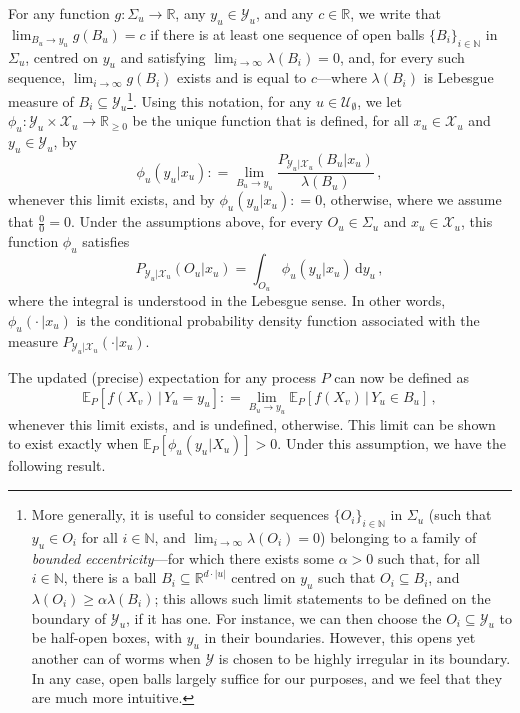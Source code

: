 \documentclass[twoside,11pt]{article}
\newcommand{\nats}{\mathbb{N}}
\newcommand{\reals}{\mathbb{R}}
\newcommand{\realsnonneg}{\reals_{\geq 0}}
\newcommand{\states}{\mathcal{X}}
\newcommand{\observs}{\mathcal{Y}}
\newcommand{\coloneqq}{:\!=}
\begin{document}
For any function $g:\Sigma_u\to\reals$, any $y_u\in\observs_u$, and any $c\in\reals$, we write that $\lim_{B_u\to y_u}g(B_u)=c$ if there is at least one sequence of open balls $\{B_i\}_{i\in\nats}$ in $\Sigma_u$, centred on $y_u$ and satisfying $\lim_{i\to\infty}\lambda(B_i)=0$, and, for every such sequence, $\lim_{i\to\infty}g(B_i)$ exists and is equal to $c$---where $\lambda(B_i)$ is Lebesgue measure of $B_i\subseteq\observs_u$\footnote{More generally, it is useful to consider sequences $\{O_i\}_{i\in\nats}$ in $\Sigma_u$ (such that $y_u\in O_i$ for all $i\in\nats$, and $\lim_{i\to\infty}\lambda(O_i)=0$) belonging to a family of \emph{bounded eccentricity}---for which there exists some $\alpha > 0$ such that, for all $i\in\nats$, there is a ball $B_i\subseteq\reals^{d\cdot\lvert u\rvert}$ centred on $y_u$ such that $O_i\subseteq B_i$, and $\lambda(O_i)\geq \alpha\lambda(B_i)$; this allows such limit statements to be defined on the boundary of $\observs_u$, if it has one. For instance, we can then choose the $O_i\subseteq\observs_u$ to be half-open boxes, with $y_u$ in their boundaries. However, this opens yet another can of worms when $\observs$ is chosen to be highly irregular in its boundary. In any case, open balls largely suffice for our purposes, and we feel that they are much more intuitive.}. Using this notation, for any $u\in\mathcal{U}_\emptyset$, we let $\phi_u:\observs_u\times\states_u\to\realsnonneg$ be the unique function that is defined, for all $x_u\in\states_u$ and $y_u\in\observs_u$, by
\begin{equation}\label{eq:density_is_limit}
\phi_u(y_u\vert x_u) \coloneqq \lim_{B_u\to y_u} \frac{P_{\observs_u\vert\states_u}(B_u\vert x_u)}{\lambda(B_u)}\,,
\end{equation}
whenever this limit exists, and by $\phi_u(y_u\vert x_u)\coloneqq 0$, otherwise, where we assume that $\frac{0}{0}=0$. Under the assumptions above, for every $O_u\in\Sigma_u$ and $x_u\in\states_u$, this function $\phi_u$ satisfies
\begin{equation}\label{eq:density_generates_measure}
P_{\observs_u\vert\states_u}(O_u\vert x_u) = \int_{O_u}\phi_u(y_u\vert x_u) \,\mathrm{d}y_u\,,
\end{equation}
where the integral is understood in the Lebesgue sense. In other words, $\phi_u(\cdot\,\vert x_u)$ is the conditional probability density function associated with the measure $P_{\observs_u\vert\states_u}(\cdot\vert x_u)$.

The updated (precise) expectation for any process $P$ can now be defined as
\begin{equation*}
\mathbb{E}_P[f(X_v)\,\vert\,Y_u=y_u] \coloneqq \lim_{B_u\to y_u} \mathbb{E}_P[f(X_v)\,\vert\,Y_u\in B_u]\,,
\end{equation*}
whenever this limit exists, and is undefined, otherwise. This limit can be shown to exist exactly when $\mathbb{E}_P[\phi_u(y_u\vert X_u)]>0$. Under this assumption, we have the following result.
\end{document}
